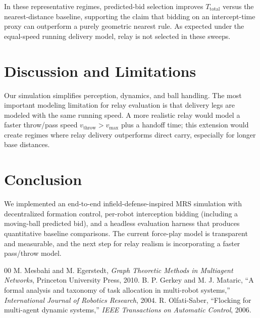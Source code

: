 \documentclass[conference]{IEEEtran}
\begin{document}
\noindent In these representative regimes, predicted-bid selection improves \(T_{\mathrm{total}}\) versus the nearest-distance baseline, supporting the claim that bidding on an intercept-time proxy can outperform a purely geometric nearest rule. As expected under the equal-speed running delivery model, relay is not selected in these sweeps.

\section{Discussion and Limitations}
\label{sec:discussion}
Our simulation simplifies perception, dynamics, and ball handling. The most important modeling limitation for relay evaluation is that delivery legs are modeled with the same running speed. A more realistic relay would model a faster throw/pass speed \(v_{\mathrm{throw}}>v_{\max}\) plus a handoff time; this extension would create regimes where relay delivery outperforms direct carry, especially for longer base distances.

\section{Conclusion}
We implemented an end-to-end infield-defense-inspired MRS simulation with decentralized formation control, per-robot interception bidding (including a moving-ball predicted bid), and a headless evaluation harness that produces quantitative baseline comparisons. The current force-play model is transparent and measurable, and the next step for relay realism is incorporating a faster pass/throw model.

\begin{thebibliography}{00}
 M. Mesbahi and M. Egerstedt, \textit{Graph Theoretic Methods in Multiagent Networks}, Princeton University Press, 2010.
 B. P. Gerkey and M. J. Mataric, ``A formal analysis and taxonomy of task allocation in multi-robot systems,'' \textit{International Journal of Robotics Research}, 2004.
 R. Olfati-Saber, ``Flocking for multi-agent dynamic systems,'' \textit{IEEE Transactions on Automatic Control}, 2006.
\end{thebibliography}
\end{document}
